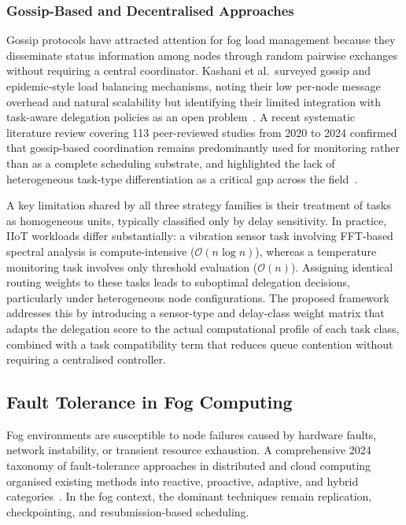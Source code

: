 \documentclass[conference]{IEEEtran}
\begin{document}
\subsubsection{Gossip-Based and Decentralised Approaches}

Gossip protocols have attracted attention for fog load management because they disseminate status information among nodes through random pairwise exchanges without requiring a central coordinator. Kashani et al.\ surveyed gossip and epidemic-style load balancing mechanisms, noting their low per-node message overhead and natural scalability but identifying their limited integration with task-aware delegation policies as an open problem~\cite{kashani2020}. A recent systematic literature review covering 113 peer-reviewed studies from 2020 to 2024 confirmed that gossip-based coordination remains predominantly used for monitoring rather than as a complete scheduling substrate, and highlighted the lack of heterogeneous task-type differentiation as a critical gap across the field~\cite{vijarania2025}.

A key limitation shared by all three strategy families is their treatment of tasks as homogeneous units, typically classified only by delay sensitivity. In practice, IIoT workloads differ substantially: a vibration sensor task involving FFT-based spectral analysis is compute-intensive ($\mathcal{O}(n \log n)$), whereas a temperature monitoring task involves only threshold evaluation ($\mathcal{O}(n)$). Assigning identical routing weights to these tasks leads to suboptimal delegation decisions, particularly under heterogeneous node configurations. The proposed framework addresses this by introducing a sensor-type and delay-class weight matrix that adapts the delegation score to the actual computational profile of each task class, combined with a task compatibility term that reduces queue contention without requiring a centralised controller.

\subsection{Fault Tolerance in Fog Computing}

Fog environments are susceptible to node failures caused by hardware faults, network instability, or transient resource exhaustion. A comprehensive 2024 taxonomy of fault-tolerance approaches in distributed and cloud computing organised existing methods into reactive, proactive, adaptive, and hybrid categories~\cite{kirti2024}. In the fog context, the dominant techniques remain replication, checkpointing, and resubmission-based scheduling.
\end{document}
